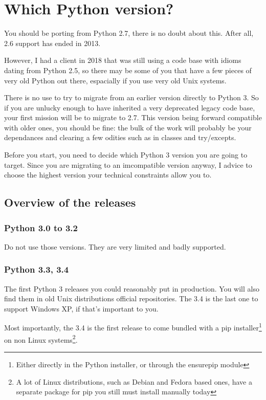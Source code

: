 \chapter{Which Python version?}

You should be porting from Python 2.7, there is no doubt about this. After all, 2.6 support has ended in 2013.

However, I had a client in 2018 that was still using a code base with idioms dating from Python 2.5, so there may be some of you that have a few pieces of very old Python out there, espacially if you use very old Unix systems.

There is no use to try to migrate from an earlier version directly to Python 3. So if you are unlucky enough to have inherited a very deprecated legacy code base, your first mission will be to migrate to 2.7. This version being forward compatible with older ones, you should be fine: the bulk of the work will probably be your dependances and clearing a few odities such as in classes and try/excepts.

Before you start, you need to decide which Python 3 version you are going to target. Since you are migrating to an imcompatible version anyway, I advice to choose the highest version your technical constraints allow you to.

\section{Overview of the releases}

\subsection{Python 3.0 to 3.2}

Do not use those versions. They are very limited and badly supported.

\subsection{Python 3.3, 3.4}

The first Python 3 releases you could reasonably put in production. You will also find them in old Unix distributions official repositories. The 3.4 is the last one to support Windows XP, if that's important to you.

Most importantly, the 3.4 is the first release to come bundled with a pip installer\footnote{Either directly in the Python installer, or through the ensurepip module} on non Linux systems\footnote{A lot of Linux distributions, such as Debian and Fedora based ones, have a separate package for pip you still must install manually today}.

